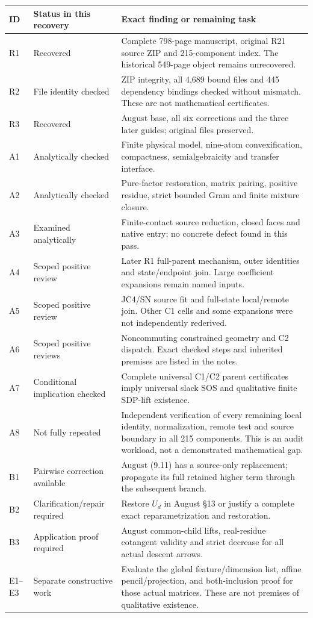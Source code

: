 \begin{longtable}{@{}L{0.10\textwidth}L{0.22\textwidth}L{0.60\textwidth}@{}}
\toprule ID & Status in this recovery & Exact finding or remaining task\\
\midrule\endhead
R1 & Recovered &
Complete 798-page manuscript, original R21 source ZIP and 215-component
index. The historical 549-page object remains unrecovered.\\
R2 & File identity checked &
ZIP integrity, all 4,689 bound files and 445 dependency bindings
checked without mismatch. These are not mathematical certificates.\\
R3 & Recovered &
August base, all six corrections and the three later guides;
original files preserved.\\
A1 & Analytically checked &
Finite physical model, nine-atom convexification, compactness,
semialgebraicity and transfer interface.\\
A2 & Analytically checked &
Pure-factor restoration, matrix pairing, positive residue,
strict bounded Gram and finite mixture closure.\\
A3 & Examined analytically &
Finite-contact source reduction, closed faces and native entry;
no concrete defect found in this pass.\\
A4 & Scoped positive review &
Later R1 full-parent mechanism, outer identities and state/endpoint
join. Large coefficient expansions remain named inputs.\\
A5 & Scoped positive review &
JC4/SN source fit and full-state local/remote join.
Other C1 cells and some expansions were not independently rederived.\\
A6 & Scoped positive reviews &
Noncommuting constrained geometry and C2 dispatch.
Exact checked steps and inherited premises are listed in the notes.\\
A7 & Conditional implication checked &
Complete universal C1/C2 parent certificates imply universal
slack SOS and qualitative finite SDP-lift existence.\\
A8 & Not fully repeated &
Independent verification of every remaining local identity,
normalization, remote test and source boundary in all 215 components.
This is an audit workload, not a demonstrated mathematical gap.\\
B1 & Pairwise correction available &
August (9.11) has a source-only replacement; propagate its full retained
higher term through the subsequent branch.\\
B2 & Clarification/repair required &
Restore \(U_d\) in August \S13 or justify a complete exact
reparametrization and restoration.\\
B3 & Application proof required &
August common-child lifts, real-residue cotangent validity and
strict decrease for all actual descent arrows.\\
E1--E3 & Separate constructive work &
Evaluate the global feature/dimension list, affine pencil/projection,
and both-inclusion proof for those actual matrices.
These are not premises of qualitative existence.\\
\bottomrule
\end{longtable}

